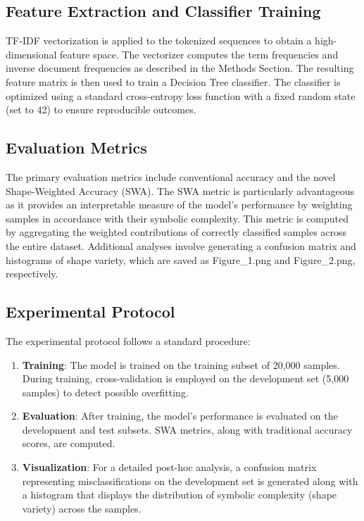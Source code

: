\documentclass{article}
\begin{document}
\subsection{Feature Extraction and Classifier Training}
TF-IDF vectorization is applied to the tokenized sequences to obtain a high-dimensional feature space. The vectorizer computes the term frequencies and inverse document frequencies as described in the Methods Section. The resulting feature matrix is then used to train a Decision Tree classifier. The classifier is optimized using a standard cross-entropy loss function with a fixed random state (set to 42) to ensure reproducible outcomes.

\subsection{Evaluation Metrics}
The primary evaluation metrics include conventional accuracy and the novel Shape-Weighted Accuracy (SWA). The SWA metric is particularly advantageous as it provides an interpretable measure of the model’s performance by weighting samples in accordance with their symbolic complexity. This metric is computed by aggregating the weighted contributions of correctly classified samples across the entire dataset. Additional analyses involve generating a confusion matrix and histograms of shape variety, which are saved as Figure\_1.png and Figure\_2.png, respectively.

\subsection{Experimental Protocol}
The experimental protocol follows a standard procedure:
\begin{enumerate}
    \item \textbf{Training}: The model is trained on the training subset of 20,000 samples. During training, cross-validation is employed on the development set (5,000 samples) to detect possible overfitting.
    \item \textbf{Evaluation}: After training, the model’s performance is evaluated on the development and test subsets. SWA metrics, along with traditional accuracy scores, are computed.
    \item \textbf{Visualization}: For a detailed post-hoc analysis, a confusion matrix representing misclassifications on the development set is generated along with a histogram that displays the distribution of symbolic complexity (shape variety) across the samples.
\end{enumerate}
\end{document}
